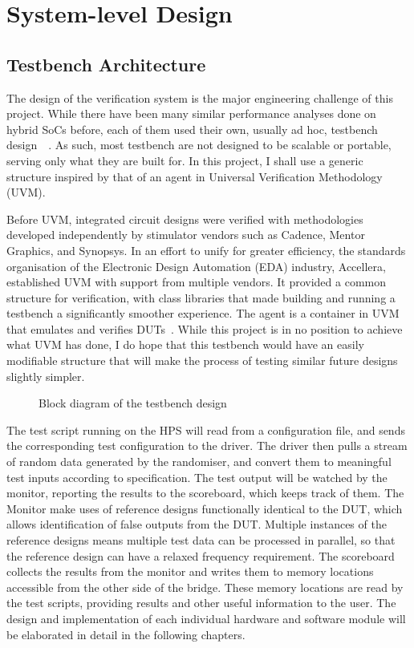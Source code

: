 \chapter{System-level Design}

\section{Testbench Architecture}
The design of the verification system is the major engineering challenge of this project.
While there have been many similar performance analyses done on hybrid SoCs before, each of them used their own, usually ad hoc, testbench design~\cite{Shi1}~\cite{Li1}.
As such, most testbench are not designed to be scalable or portable, serving only what they are built for.
In this project, I shall use a generic structure inspired by that of an agent in Universal Verification Methodology (UVM).

Before UVM, integrated circuit designs were verified with methodologies developed independently by stimulator vendors such as Cadence, Mentor Graphics, and Synopsys.
In an effort to unify for greater efficiency, the standards organisation of the Electronic Design Automation (EDA) industry, Accellera, established UVM with support from multiple vendors.
It provided a common structure for verification, with class libraries that made building and running a testbench a significantly smoother experience.
The agent is a container in UVM that emulates and verifies DUTs~\cite{Accellera1}.
While this project is in no position to achieve what UVM has done, I do hope that this testbench would have an easily modifiable structure that will make the process of testing similar future designs slightly simpler.

\begin{figure}[H]
  \centering
  
  \caption{Block diagram of the testbench design}
  \label{Block}
\end{figure}

The test script running on the HPS will read from a configuration file, and sends the corresponding test configuration to the driver.
The driver then pulls a stream of random data generated by the randomiser, and convert them to meaningful test inputs according to specification.
The test output will be watched by the monitor, reporting the results to the scoreboard, which keeps track of them.
The Monitor make uses of reference designs functionally identical to the DUT, which allows identification of false outputs from the DUT.
Multiple instances of the reference designs means multiple test data can be processed in parallel, so that the reference design can have a relaxed frequency requirement.
The scoreboard collects the results from the monitor and writes them to memory locations accessible from the other side of the bridge.
These memory locations are read by the test scripts, providing results and other useful information to the user.
The design and implementation of each individual hardware and software module will be elaborated in detail in the following chapters.


